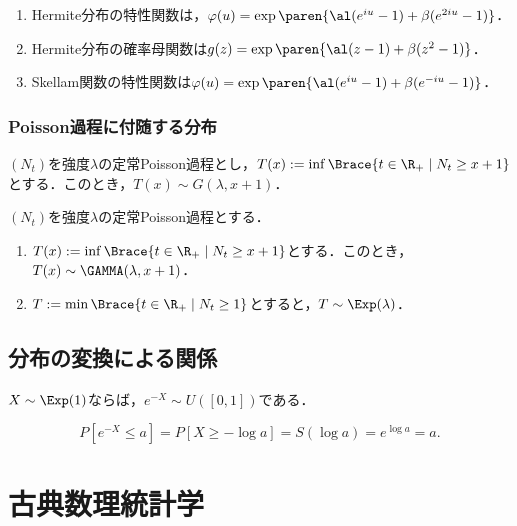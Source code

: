 \documentclass[uplatex,dvipdfmx]{jsreport}
\begin{document}
\begin{lemma}\mbox{}
    \begin{enumerate}
        \item Hermite分布の特性関数は，$\varphi(u)=\exp\paren{\al(e^{iu}-1)+\beta(e^{2iu}-1)}$．
        \item Hermite分布の確率母関数は$g(z)=\exp\paren{\al(z-1)+\beta(z^2-1)}$．
        \item Skellam関数の特性関数は$\varphi(u)=\exp\paren{\al(e^{iu}-1)+\beta(e^{-iu}-1)}$．
    \end{enumerate}
\end{lemma}

\subsection{Poisson過程に付随する分布}

\begin{proposition}[Poisson分布の区間的性質]
    $(N_t)$を強度$\lambda$の定常Poisson過程とし，$T(x):=\inf\Brace{t\in\R_+\mid N_t\ge x+1}$とする．このとき，$T(x)\sim G(\lambda,x+1)$．
\end{proposition}

\begin{proposition}[Poisson過程の区間的性質]
    $(N_t)$を強度$\lambda$の定常Poisson過程とする．
    \begin{enumerate}
        \item $T(x):=\inf\Brace{t\in\R_+\mid N_t\ge x+1}$とする．このとき，$T(x)\sim\GAMMA(\lambda,x+1)$．
        \item $T:=\min\Brace{t\in\R_+\mid N_t\ge1}$とすると，$T\sim\Exp(\lambda)$．
    \end{enumerate}
\end{proposition}

\section{分布の変換による関係}

\begin{proposition}
    $X\sim\Exp(1)$ならば，$e^{-X}\sim U([0,1])$である．
\end{proposition}
\begin{Proof}
    \[P[e^{-X}\le a]=P[X\ge-\log a]=S(\log a)=e^{\log a}=a.\]
\end{Proof}

\chapter{古典数理統計学}
\end{document}
